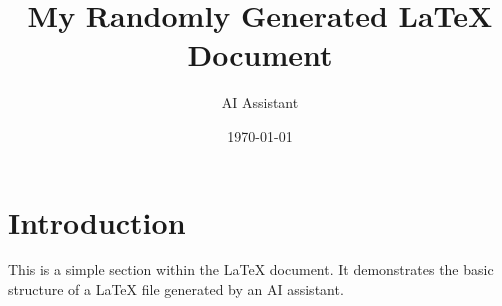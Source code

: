 \documentclass{article}
\title{My Randomly Generated LaTeX Document}
\author{AI Assistant}
\date{\today}
\begin{document}
\maketitle

\section{Introduction}
This is a simple section within the LaTeX document. It demonstrates the basic structure of a LaTeX file generated by an AI assistant.
\end{document}
